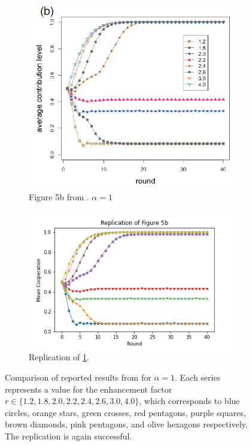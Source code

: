 \FloatBarrier
\begin{figure}[!h] 
  \begin{subfigure}[b]{0.45\textwidth}
    \includegraphics[width=\textwidth]{images/TAfig4b_real.png}
    \caption{Figure 5b from \cite{RN49}. $\alpha = 1$ }
    \label{TAfig4b_real}
  \end{subfigure}
  \hfill
  \begin{subfigure}[b]{0.45\textwidth}
    \includegraphics[width=1.35\textwidth]{images/TAfig4b.png}
    \caption{Replication of \ref{TAfig4b_real}. }
    \label{TAfig4b}
  \end{subfigure}
  \caption{Comparison of reported results from \cite{RN49} for $\alpha = 1$. Each series represents a value for the enhancement factor $r \in \{1.2, 1.8, 2.0, 2.2, 2.4, 2.6, 3.0, 4.0\}$, which corresponds to blue circles, orange stars, green crosses, red pentagons, purple squares, brown diamonds, pink pentagons, and olive hexagons respectively. The replication is again successful. } \label{comp2}
\end{figure} 
\FloatBarrier

